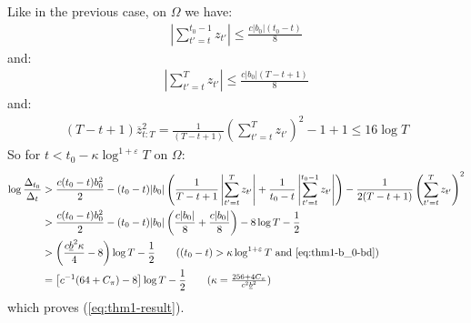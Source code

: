 \documentclass{article}
\begin{document}
\normalsize
Like in the previous case, on $\Omega$ we have:
\begin{align*}
    \left|\sum_{t'=t}^{t_0-1}z_{t'}\right| \leq \frac{c|b_0|(t_0 - t)}{8} 
\end{align*}
and:
\begin{align*}
    \left|\sum_{t'=t}^T z_{t'}\right| \leq \frac{c|b_0|(T - t + 1)}{8} 
\end{align*}
and:
\begin{align*}
    (T-t+1)\overline{z}^2_{t:T} = \frac{1}{(T-t+1)}\left(\sum_{t'=t}^T z_{t'}\right)^2 - 1 +1 \leq 16\log T
\end{align*}
So for $t < t_0 - \kappa \log^{1+\varepsilon} T$ on $\Omega$:
\begin{align*}
    \log \frac{\Delta_{t_0}}{\Delta_t} &> \frac{c (t_0-t)b_0^2 }{2} - (t_0 -t) |b_0| \left(\frac{1}{T-t+1}\left|\sum_{t'=t}^{T} z_{t'}\right| + \frac{1}{t_0-t}\left|\sum_{t'=t}^{t_0-1} z_{t'}\right|\right) -\frac{1}{2(T-t+1)}\left(\sum_{t'=t}^{T} z_{t'}\right)^2 \\
    &> \frac{c (t_0-t)b_0^2 }{2} - (t_0 -t) |b_0| \left(\frac{c|b_0|}{8} + \frac{c|b_0|}{8}\right) -8\log T - \frac{1}{2} \\
    &> \left(\frac{c\underline{b}^2\kappa}{4} - 8\right)\log T - \frac{1}{2} \tag{$(t_0-t) > \kappa\log^{1+\varepsilon} T$ and \ref{eq:thm1-b_0-bd}} \\
    &= \left[c^{-1}(64 + C_\pi) - 8\right] \log T - \frac{1}{2} \tag{$\kappa = \frac{256 + 4 C_\pi}{c^2\underline{b}^2}$}
\end{align*}
which proves (\ref{eq:thm1-result}).
\end{document}
